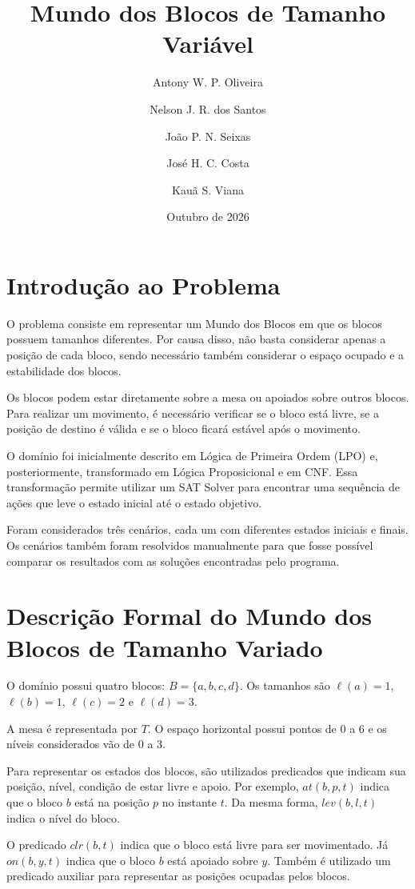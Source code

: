 \documentclass{article}
\title{Mundo dos Blocos de Tamanho Variável}
\author{
Antony W. P. Oliveira
\and Nelson J. R. dos Santos
\and João P. N. Seixas
\and José H. C. Costa
\and Kauã S. Viana
}
\date{Outubro de 2026}
\begin{document}
\maketitle

\section{Introdução ao Problema}

O problema consiste em representar um Mundo dos Blocos em que os blocos possuem tamanhos diferentes. Por causa disso, não basta considerar apenas a posição de cada bloco, sendo necessário também considerar o espaço ocupado e a estabilidade dos blocos.

Os blocos podem estar diretamente sobre a mesa ou apoiados sobre outros blocos. Para realizar um movimento, é necessário verificar se o bloco está livre, se a posição de destino é válida e se o bloco ficará estável após o movimento.

O domínio foi inicialmente descrito em Lógica de Primeira Ordem (LPO) e, posteriormente, transformado em Lógica Proposicional e em CNF. Essa transformação permite utilizar um SAT Solver para encontrar uma sequência de ações que leve o estado inicial até o estado objetivo.

Foram considerados três cenários, cada um com diferentes estados iniciais e finais. Os cenários também foram resolvidos manualmente para que fosse possível comparar os resultados com as soluções encontradas pelo programa.

\section{Descrição Formal do Mundo dos Blocos de Tamanho Variado}

O domínio possui quatro blocos: $B=\{a,b,c,d\}$. Os tamanhos são $\ell(a)=1$, $\ell(b)=1$, $\ell(c)=2$ e $\ell(d)=3$.

A mesa é representada por $T$. O espaço horizontal possui pontos de 0 a 6 e os níveis considerados vão de 0 a 3.

Para representar os estados dos blocos, são utilizados predicados que indicam sua posição, nível, condição de estar livre e apoio. Por exemplo, $at(b,p,t)$ indica que o bloco $b$ está na posição $p$ no instante $t$. Da mesma forma, $lev(b,l,t)$ indica o nível do bloco.

O predicado $clr(b,t)$ indica que o bloco está livre para ser movimentado. Já $on(b,y,t)$ indica que o bloco $b$ está apoiado sobre $y$. Também é utilizado um predicado auxiliar para representar as posições ocupadas pelos blocos.
\end{document}
